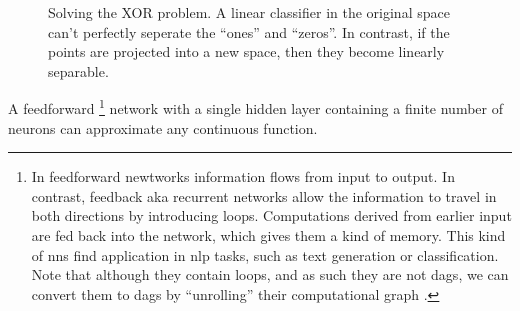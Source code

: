 \begin{figure}
	\centering
	\begin{subfigure}[b]{0.49\textwidth}
	\end{subfigure}
	\begin{subfigure}[b]{0.49\textwidth}
	\end{subfigure}
	\caption[Solving the XOR problem.]{Solving the XOR problem. A linear
	classifier in the original space can't perfectly seperate the ``ones'' and
	``zeros''. In contrast, if the points are projected into a new space, then
	they become linearly separable.}
	\label{fig:xor}
\end{figure}

\begin{theorem}
	\label{thrm:universal}
	A feedforward \footnote{In feedforward newtworks information flows from
	input to output. In contrast, feedback aka recurrent networks allow the
	information to travel in both directions by introducing loops. Computations
	derived from earlier input are fed back into the network, which gives them a
	kind of memory. This kind of \glspl{nn} find application in \gls{nlp}
	tasks, such as text generation or
	classification. Note that although they contain loops, and as such they are
	not \glspl{dag}, we can convert them to \glspl{dag} by ``unrolling'' their
	computational graph \parencite{LeCun2015}.} network with a single hidden layer containing a finite number of neurons
	can approximate any continuous function.
\end{theorem}

